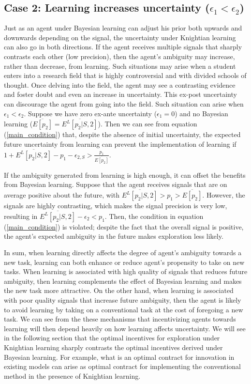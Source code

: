 \documentclass[11pt]{article} %
\theoremstyle{exampstyle}
\begin{document}
\subsection{Case 2: Learning increases uncertainty ($\epsilon_1 < \epsilon_2$)} 
Just as an agent under Bayesian learning can adjust his prior both upwards and downwards depending on the signal, the uncertainty under Knightian learning can also go in both directions. If the agent receives multiple signals that sharply contrasts each other (low precision), then the agent's ambiguity may increase, rather than decrease, from learning. Such situations may arise when a student enters into a research field that is highly controversial and with divided schools of thought. Once delving into the field, the agent may see a contrasting evidence and foster doubt and even an increase in uncertainty. This ex-post uncertainty can discourage the agent from going into the field. Such situation can arise when $\epsilon_1 < \epsilon_2$. Suppose we have zero ex-ante uncertainty ($\epsilon_1=0$) and no Bayesian learning ($\overline{E[p_2]} = \overline{E^L[p_2|S,2]}$). Then we can see from equation (\ref{main_condition}) that, despite the absence of initial uncertainty, the expected future uncertainty from learning can prevent the implementation of learning if  $1+\overline{E^L[p_2|S,2]} - p_1  - \epsilon_{2,S}  > \frac{p_1}{\overline{E[p_2]}}$. 

If the ambiguity generated from learning is high enough, it can offset the benefits from Bayesian learning. Suppose that the agent receives signals that are on average positive about the future, with $\overline{E^L[p_2|S,2]} > p_1 > \overline{E[p_2]}$. However, the signals are highly contrasting, which makes the signal precision is very low, resulting in $\overline{E^L[p_2|S,2]} - \epsilon_2 < p_1$. Then, the condition in equation (\ref{main_condition}) is violated; despite the fact that the overall signal is positive, the agent's expected ambiguity in the future makes exploration less likely. 

In sum, when learning directly affects the degree of agent's ambiguity towards a new task, learning can both enhance or reduce agent's propensity to take on new tasks. When learning is associated with high quality of signals that reduces future ambiguity, then learning complements the effect of Bayesian learning and makes the new task more attractive. On the other hand, when learning is associated with poor quality signals that increase future ambiguity, then the agent is likely to avoid learning by taking on a conventional task at the cost of foregoing a new task. We can see from the these mechanisms that incentivizing agents towards learning will then depend heavily on how learning affects uncertainty. We will see in the following section that the optimal incentives for exploration under Knightian learning sharply contrasts the optimal incentives derived under Bayesian learning. For example, what is an optimal contract for innovation in existing models can arise as optimal contract for implementing the conventional method in the presence of Knightian learning. 
\end{document}
